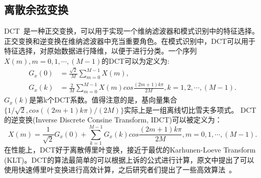 \subsection{离散余弦变换}
\label{sec:dct}
DCT~\cite{ahmed1974discrete}是一种正交变换，可以用于实现一个维纳滤波器和模式识别中的特征选择。正交变换和逆变换在维纳滤波器中充当重要角色。在模式识别中，DCT可以用于特征选择，对原始数据进行降维，以便于进行分类。一个序列$X(m),m=0,1,\cdots,(M-1)$的DCT可以为定义为:
\begin{equation}
\label{equ:dct}
\begin{aligned}
G_{x}\left( 0\right) &= \frac{\sqrt{2}}{M} \sum_{m=0}^{M-1}X\left( m\right), \\
G_{x}\left( k\right) &= \frac{2}{M} \sum_{m=0}^{M-1}X\left( m\right)cos\frac{\left(2m+1\right)k\pi}{2M}, k=1,2,\cdots,(M-1).
\end{aligned}
\end{equation}
$G_{x}(k)$是第k个DCT系数。值得注意的是，基向量集合$\{ 1/\sqrt{2}, cos((2m+1)k\pi)/(2M) \}$实际上是一组离线切比雪夫多项式。
DCT的逆变换(Inverse Discrete Consine Transform, IDCT)可以被定义为：
\begin{equation}
\label{equ:idct}
X(m) = \frac{1}{\sqrt{2}}G_{x}(0) + \sum_{k=1}^{M-1}G_{x}(k)cos\frac{(2m+1)k\pi}{2M}, m=0,1,\cdots,(M-1). 
\end{equation}
在性能上，DCT好于离散傅里叶变换，接近于最优的Karhunen-Loeve Transform (KLT)。DCT的算法最简单的可以根据上诉的公式进行计算，原文\cite{ahmed1974discrete}中提出了可以使用快速傅里叶变换进行高效计算，之后研究者们提出了一些高效算法~\cite{winograd1978computing,lee1984new,hou1987fast}。

